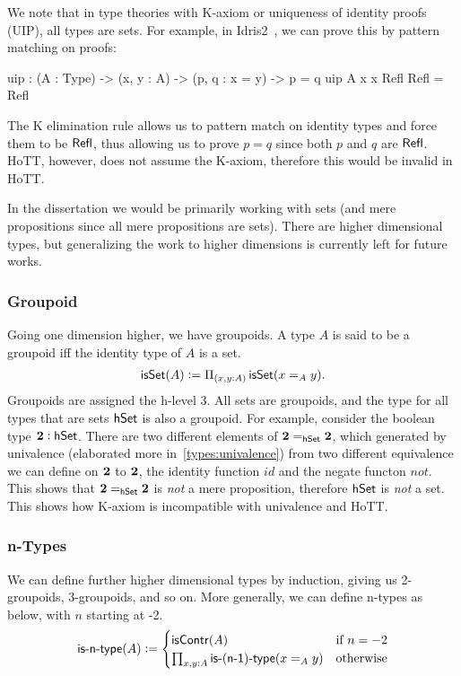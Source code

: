 We note that in type theories with K-axiom or uniqueness of identity proofs
(UIP), all types are sets. For example, in Idris2~\cite{brady_idris_2021},
we can prove this
by pattern matching on proofs:
\begin{code}
uip : (A : Type) -> (x, y : A) -> (p, q : x = y) -> p = q
uip A x x Refl Refl = Refl
\end{code}

The K elimination rule allows us to pattern match on identity types and force
them to be $\operatorname{\mathsf{Refl}}$, thus allowing us to prove $p = q$ since both
$p$ and $q$ are $\operatorname{\mathsf{Refl}}$. HoTT, however, does not assume the K-axiom,
therefore this would be invalid in HoTT.

In the dissertation we would be primarily working with sets
(and mere propositions since all mere propositions are sets).
There are higher dimensional types, but generalizing the work to
higher dimensions is currently left for future works.

\subsubsection{Groupoid}
Going one dimension higher, we have groupoids. A type $A$ is said to be a
groupoid iff the identity type of $A$ is a set.
\begin{align*}
    \operatorname{\mathsf{isSet}}(A) := \Pi_{(x,y : A)}\operatorname{\mathsf{isSet}}(x =_A y).
\end{align*}
Groupoids are assigned the h-level 3. All sets are groupoids,
and the type for all types that are sets $\mathsf{hSet}$ is also a groupoid.
For example, consider the boolean type ${\mathbf{2}} : \mathsf{hSet}$. There are two
different elements of ${\mathbf{2}} =_{\mathsf{hSet}} {\mathbf{2}}$, which generated by
univalence (elaborated more in~\cref{types:univalence}) from two
different equivalence we can define on ${\mathbf{2}}$ to ${\mathbf{2}}$, the
identity function $id$ and the negate functon $not$.
This shows that ${\mathbf{2}} =_{\mathsf{hSet}} {\mathbf{2}}$ is \emph{not} a mere proposition,
therefore $\mathsf{hSet}$ is \emph{not} a set. This shows how K-axiom is
incompatible with univalence and HoTT.

\subsubsection{n-Types}
We can define further higher dimensional types by induction, giving us
2-groupoids, 3-groupoids, and so on. More generally, we can define
n-types as below, with $n$ starting at -2.
\begin{align*}
    \operatorname{\mathsf{is-n-type}}(A) := \begin{cases}
        \operatorname{\mathsf{isContr}}(A) & \text{if $n = -2$} \\
        \prod_{x, y : A}\operatorname{\mathsf{is-(n-1)-type}}(x =_A y) & \text{otherwise}
    \end{cases}
\end{align*}

